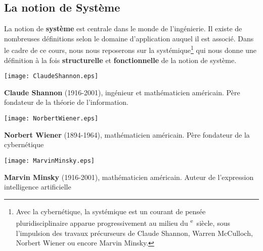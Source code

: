\subsection{La notion de Système}
La notion de \textbf{système} est centrale dans le monde de l'ingénierie.
Il existe de nombreuses définitions selon le domaine 
d'application auquel il est associé. Dans le cadre de ce cours, nous nous 
reposerons sur la systémique\footnote{Avec la cybernétique, la systémique est 
un courant de pensée pluridisciplinaire apparue progressivement au milieu du 
\textsc{}\textsuperscript{e}~siècle, sous l'impulsion des 
travaux précurseurs de Claude Shannon, 
Warren McCulloch, 
Norbert Wiener 
ou encore Marvin Minsky.} qui nous donne une définition 
à la fois \textbf{structurelle} et \textbf{fonctionnelle} de 
la notion de système.
\begin{marginfigure}
    \centering
    \texttt{[image: ClaudeShannon.eps]}
    \caption*{\textbf{Claude Shannon} (1916-2001), ingénieur et 
              mathématicien américain. 
              Père fondateur de la théorie de l'information.}
\end{marginfigure}
\begin{marginfigure}
    \centering
    \texttt{[image: NorbertWiener.eps]}
    \caption*{\textbf{Norbert Wiener} (1894-1964), mathématicien 
              américain. Père fondateur de la cybernétique}
\end{marginfigure}
\begin{marginfigure}
    \centering
    \texttt{[image: MarvinMinsky.eps]}
    \caption*{\textbf{Marvin Minsky} (1916-2001), mathématicien américain. 
              Auteur de l'expression \og intelligence artificielle\fg}
\end{marginfigure}

